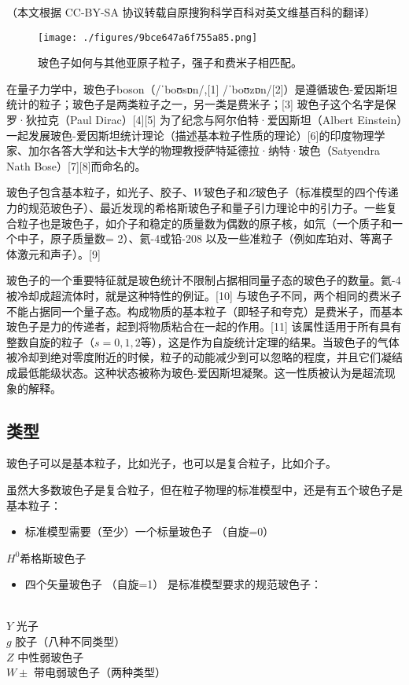 
（本文根据 CC-BY-SA 协议转载自原搜狗科学百科对英文维基百科的翻译）

\begin{figure}[ht]
\centering
\texttt{[image: ./figures/9bce647a6f755a85.png]}
\caption{玻色子如何与其他亚原子粒子，强子和费米子相匹配。} \label{fig_Boson_2}
\end{figure}

在量子力学中，玻色子boson（/ˈboʊsɒn/,[1] /ˈboʊzɒn/[2]）是遵循玻色-爱因斯坦统计的粒子；玻色子是两类粒子之一，另一类是费米子；[3] 玻色子这个名字是保罗·狄拉克（Paul Dirac）[4][5] 为了纪念与阿尔伯特·爱因斯坦（Albert Einstein）一起发展玻色-爱因斯坦统计理论（描述基本粒子性质的理论）[6]的印度物理学家、加尔各答大学和达卡大学的物理教授萨特延德拉·纳特·玻色（Satyendra Nath Bose）[7][8]而命名的。

玻色子包含基本粒子，如光子、胶子、$W$玻色子和$Z$玻色子（标准模型的四个传递力的规范玻色子）、最近发现的希格斯玻色子和量子引力理论中的引力子。一些复合粒子也是玻色子，如介子和稳定的质量数为偶数的原子核，如氘（一个质子和一个中子，原子质量数= 2）、氦-4或铅-208 以及一些准粒子（例如库珀对、等离子体激元和声子）。[9]

玻色子的一个重要特征就是玻色统计不限制占据相同量子态的玻色子的数量。氦-4被冷却成超流体时，就是这种特性的例证。[10] 与玻色子不同，两个相同的费米子不能占据同一个量子态。构成物质的基本粒子（即轻子和夸克）是费米子，而基本玻色子是力的传递者，起到将物质粘合在一起的作用。[11] 该属性适用于所有具有整数自旋的粒子（$s=0,1,2$等），这是作为自旋统计定理的结果。当玻色子的气体被冷却到绝对零度附近的时候，粒子的动能减少到可以忽略的程度，并且它们凝结成最低能级状态。这种状态被称为玻色-爱因斯坦凝聚。这一性质被认为是超流现象的解释。

\subsection{类型}
玻色子可以是基本粒子，比如光子，也可以是复合粒子，比如介子。

虽然大多数玻色子是复合粒子，但在粒子物理的标准模型中，还是有五个玻色子是基本粒子：
\begin{itemize}
\item 标准模型需要（至少）一个标量玻色子 （自旋=0）
\end{itemize}
$H^0$希格斯玻色子
\begin{itemize}
\item 四个矢量玻色子 （自旋=1） 是标准模型要求的规范玻色子：
\end{itemize}\\
$Y$   光子\\
$g$   胶子（八种不同类型）\\
$Z$   中性弱玻色子\\
$W\pm$   带电弱玻色子（两种类型）\\

